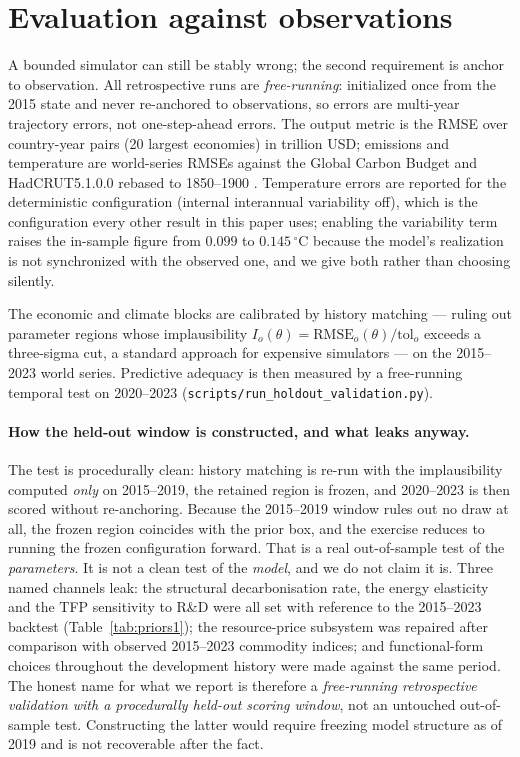 \documentclass[12pt,a4paper]{article}
\newcommand{\degC}{$^{\circ}$C}
\newcommand{\rmseTempIn}{0.099}        \newcommand{\rmseTempInStoch}{0.145}
\begin{document}
\section{Evaluation against observations}
\label{sec:valid}

A bounded simulator can still be stably wrong; the second requirement is anchor to
observation. All retrospective runs are \emph{free-running}: initialized once from the 2015
state and never re-anchored to observations, so errors are multi-year trajectory errors, not
one-step-ahead errors. The output metric is the RMSE over country-year pairs (20 largest
economies) in trillion USD; emissions and temperature are world-series RMSEs against the
Global Carbon Budget \citep{friedlingstein2023} and HadCRUT5.1.0.0 rebased to 1850--1900
\citep{morice2021}. Temperature errors are reported for the deterministic configuration
(internal interannual variability off), which is the configuration every other result in this
paper uses; enabling the variability term raises the in-sample figure from $\rmseTempIn$ to
$\rmseTempInStoch$\,\degC{} because the model's realization is not synchronized with the
observed one, and we give both rather than choosing silently.

The economic and climate blocks are calibrated by history matching --- ruling out parameter
regions whose implausibility $I_o(\theta)=\mathrm{RMSE}_o(\theta)/\mathrm{tol}_o$ exceeds a
three-sigma cut, a standard approach for expensive simulators
\citep{craig1997,williamson2013} --- on the 2015--2023 world series. Predictive adequacy is
then measured by a free-running temporal test on 2020--2023
(\texttt{scripts/run\_holdout\_validation.py}).

\paragraph{How the held-out window is constructed, and what leaks anyway.} The test is
procedurally clean: history matching is re-run with the implausibility computed \emph{only} on
2015--2019, the retained region is frozen, and 2020--2023 is then scored without
re-anchoring. Because the 2015--2019 window rules out no draw at all, the frozen region
coincides with the prior box, and the exercise reduces to running the frozen configuration
forward. That is a real out-of-sample test of the \emph{parameters}. It is not a clean test of
the \emph{model}, and we do not claim it is. Three named channels leak: the structural
decarbonisation rate, the energy elasticity and the TFP sensitivity to R\&D were all set with
reference to the 2015--2023 backtest (Table~\ref{tab:priors1}); the resource-price subsystem
was repaired after comparison with observed 2015--2023 commodity indices; and functional-form
choices throughout the development history were made against the same period. The honest name
for what we report is therefore a \emph{free-running retrospective validation with a
procedurally held-out scoring window}, not an untouched out-of-sample test. Constructing the
latter would require freezing model structure as of 2019 and is not recoverable after the
fact.
\end{document}
